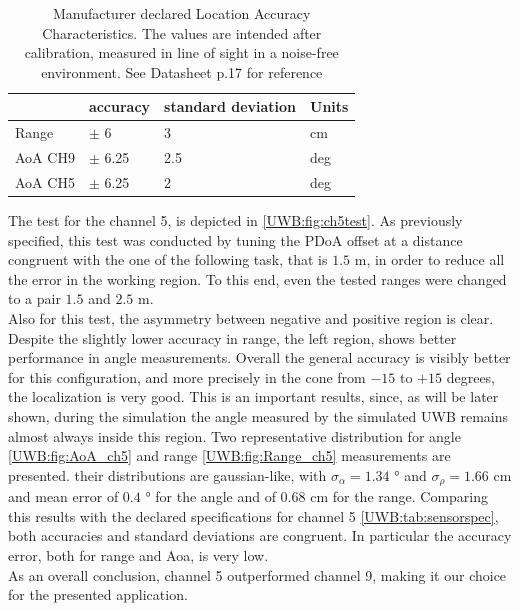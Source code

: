 \begin{table}
    \centering
    \begin{tabular}{ | m{1.3cm} | m{1.2cm}| m{2.1cm} | m{0.7cm} |} 
        \hline
        &  accuracy & standard deviation & Units\\ 
        \hline
        Range & $\pm $ 6 & 3 & cm\\ 
        \hline
        AoA CH9 &$\pm$ 6.25 & 2.5 & deg \\
        \hline
        AoA CH5 &$\pm$ 6.25 & 2 & deg \\
        \hline
    \end{tabular}
    \captionsetup{type=table}
    \caption{Manufacturer declared Location Accuracy Characteristics. The values are intended after calibration, measured in line of sight in a noise-free environment. See Datasheet p.17 for reference\cite{UWBDatasheet}}
    \label{UWB:tab:sensorspec}
\end{table}
The test for the channel 5, is depicted in \autoref{UWB:fig:ch5test}. As previously specified, this test was conducted by tuning the PDoA offset at a distance congruent with the one of the following task, that is $1.5$ m, in order to reduce all the error in the working region. To this end, even the tested ranges were changed to a pair $1.5$ and $2.5$ m.\\
Also for this test, the asymmetry between negative and positive region is clear. Despite the slightly lower accuracy in range, the left region, shows better performance in angle measurements. Overall the general accuracy is visibly better for this configuration, and more precisely in the cone from $-15$ to $+15$ degrees, the localization is very good. This is an important results, since, as will be later shown, during the simulation the angle measured by the simulated UWB remains almost always inside this region. Two representative distribution for angle \autoref{UWB:fig:AoA_ch5} and range \autoref{UWB:fig:Range_ch5} measurements are presented. their distributions are gaussian-like, with $\sigma_{\alpha} = 1.34$ ° and $\sigma_{\rho} = 1.66$ cm and mean error of $0.4$ ° for the angle and of $0.68$ cm for the range. Comparing this results with the declared specifications for channel 5 \autoref{UWB:tab:sensorspec}, both accuracies and standard deviations are congruent. In particular the accuracy error, both for range and Aoa, is very low.\\
As an overall conclusion, channel 5 outperformed channel 9, making it our choice for the presented application.\\

